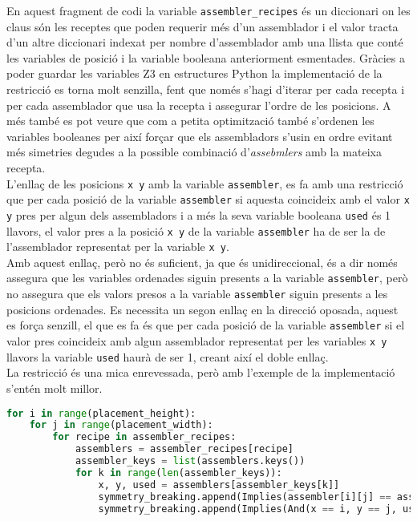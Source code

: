 En aquest fragment de codi la variable \texttt{assembler\_recipes} és un diccionari on les claus són les receptes que poden requerir més d'un assemblador i el valor tracta d'un altre diccionari indexat per nombre d'assemblador amb una llista que conté les variables de posició i la variable booleana anteriorment esmentades. Gràcies a poder guardar les variables Z3 en estructures Python la implementació de la restricció es torna molt senzilla, fent que només s'hagi d'iterar per cada recepta i per cada assemblador que usa la recepta i assegurar l'ordre de les posicions. A més també es pot veure que com a petita optimització també s'ordenen les variables booleanes per així forçar que els assembladors s'usin en ordre evitant més simetries degudes a la possible combinació d'\textit{assebmlers} amb la mateixa recepta.\\

L'enllaç de les posicions \texttt{x y} amb la variable \texttt{assembler}, es fa amb una restricció que per cada posició de la variable \texttt{assembler} si aquesta coincideix amb el valor \texttt{x y} pres per algun dels assembladors i a més la seva variable booleana \texttt{used} és 1 llavors, el valor pres a la posició \texttt{x y} de la variable \texttt{assembler} ha de ser la de l'assemblador representat per la variable \texttt{x y}.\\
Amb aquest enllaç, però no és suficient, ja que és unidireccional, és a dir només assegura que les variables ordenades siguin presents a la variable \texttt{assembler}, però no assegura que els valors presos a la variable \texttt{assembler} siguin presents a les posicions ordenades. Es necessita un segon enllaç en la direcció oposada, aquest es força senzill, el que es fa és que per cada posició de la variable \texttt{assembler} si el valor pres coincideix amb algun assemblador representat per les variables \texttt{x y} llavors la variable \texttt{used} haurà de ser 1, creant així el doble enllaç.\\
La restricció és una mica enrevessada, però amb l'exemple de la implementació s'entén molt millor.

\begin{lstlisting}[language=Python, caption=Enllaç entre variables]
for i in range(placement_height):
    for j in range(placement_width):
        for recipe in assembler_recipes:
            assemblers = assembler_recipes[recipe]
            assembler_keys = list(assemblers.keys())
            for k in range(len(assembler_keys)):
                x, y, used = assemblers[assembler_keys[k]]
                symmetry_breaking.append(Implies(assembler[i][j] == assembler_keys[k], used == 1))
                symmetry_breaking.append(Implies(And(x == i, y == j, used == 1), assembler[i][j] == assembler_keys[k]))
\end{lstlisting}

